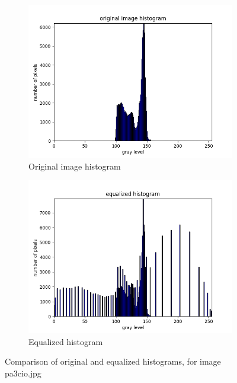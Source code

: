 \documentclass[10pt]{article}
\begin{document}
\begin{figure}[!ht]
  \centering
  \begin{subfigure}{0.4\textwidth}
    \includegraphics[width=\textwidth]{images/pa3cio-h.png}
    \caption{Original image histogram}
    \label{fig:pa3cio-original-histogram}
  \end{subfigure}
  \begin{subfigure}{0.4\textwidth}
    \includegraphics[width=\textwidth]{images/pa3cio-e.png}
    \caption{Equalized histogram}
    \label{fig:pa3cio-equalized-histogram}
  \end{subfigure}
  \caption{Comparison of original and equalized histograms, for image pa3cio.jpg}
\end{figure}
\end{document}
